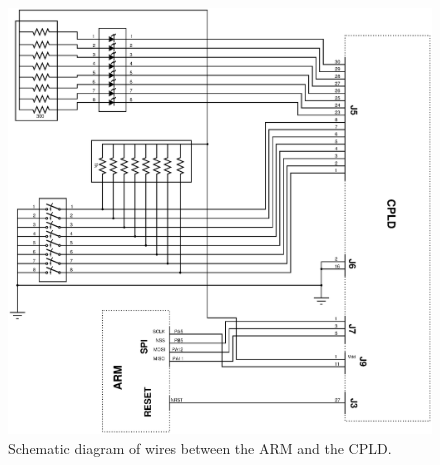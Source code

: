 \documentclass{article}
\begin{document}
\begin{figure}
\center
\includegraphics[scale=0.7]{figures/schematics/SPI_LEDs_SW}
\caption{Schematic diagram of wires between the ARM and the CPLD.}
\label{fig:arm_to_cpld}
\end{figure}
\end{document}
